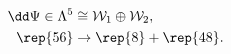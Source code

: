 \begin{equation}
\begin{aligned}
   \dd \Psi \in \Lambda^5 &\cong \mathcal{W}_1 \oplus \mathcal{W}_2 , \\
   \rep{56} &\to \rep{8} + \rep{48} .
\end{aligned}
\end{equation}

